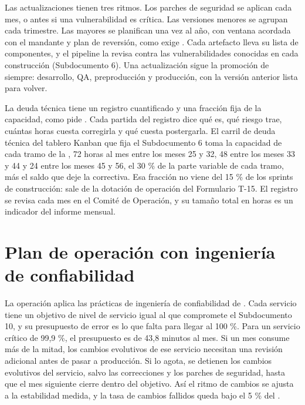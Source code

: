 Las actualizaciones tienen tres ritmos. Los parches de seguridad se aplican cada mes, o antes si una
vulnerabilidad es crítica. Las versiones menores se agrupan cada trimestre. Las mayores se planifican una
vez al año, con ventana acordada con el mandante y plan de reversión, como exige
. Cada artefacto lleva su lista de componentes, y el pipeline la revisa contra las
vulnerabilidades conocidas en cada construcción (Subdocumento 6). Una actualización sigue la promoción
de siempre: desarrollo, QA, preproducción y producción, con la versión anterior lista para volver.

La deuda técnica tiene un registro cuantificado y una fracción fija de la capacidad, como pide
. Cada partida del registro dice qué es, qué riesgo trae, cuántas horas cuesta
corregirla y qué cuesta postergarla. El carril de deuda técnica del tablero Kanban que fija el
Subdocumento 6 toma la capacidad de cada tramo de la , 72 horas al mes entre los
meses 25 y 32, 48 entre los meses 33 y 44 y 24 entre los meses 45 y 56, el 30 \% de la parte variable
de cada tramo, más el saldo que deje la correctiva. Esa fracción no viene del 15 \% de los sprints de construcción: sale de
la dotación de operación del Formulario T-15. El registro se revisa cada mes en el Comité de Operación, y
su tamaño total en horas es un indicador del informe mensual.

\section{Plan de operación con ingeniería de confiabilidad}\label{sec:11-plan-de-operacion-con-ingenieria}

La operación aplica las prácticas de ingeniería de confiabilidad de \textcite{beyer2016}. Cada servicio
tiene un objetivo de nivel de servicio igual al que compromete el Subdocumento 10, y su presupuesto de
error es lo que falta para llegar al 100 \%. Para un servicio crítico de 99,9 \%, el presupuesto es de
43,8 minutos al mes. Si un mes consume más de la mitad, los cambios evolutivos de ese servicio necesitan
una revisión adicional antes de pasar a producción. Si lo agota, se detienen los cambios evolutivos del
servicio, salvo las correcciones y los parches de seguridad, hasta que el mes siguiente cierre dentro del
objetivo. Así el ritmo de cambios se ajusta a la estabilidad medida, y la tasa de cambios fallidos queda
bajo el 5 \% del .

